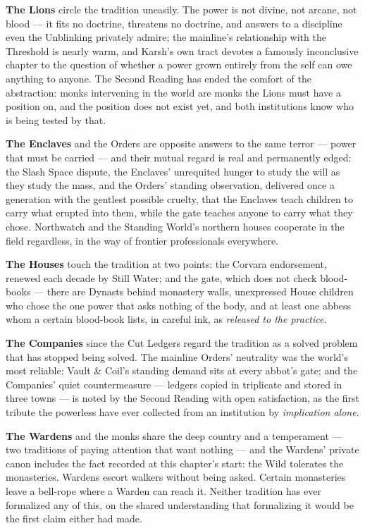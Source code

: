 \textbf{The Lions} circle the tradition uneasily. The power is not divine, not arcane, not blood --- it fits no doctrine, threatens no doctrine, and answers to a discipline even the Unblinking privately admire; the mainline's relationship with the Threshold is nearly warm, and Karsh's own tract devotes a famously inconclusive chapter to the question of whether a power grown entirely from the self can owe anything to anyone. The Second Reading has ended the comfort of the abstraction: monks intervening in the world are monks the Lions must have a position on, and the position does not exist yet, and both institutions know who is being tested by that.

\textbf{The Enclaves} and the Orders are opposite answers to the same terror --- power that must be carried --- and their mutual regard is real and permanently edged: the Slash Space dispute, the Enclaves' unrequited hunger to study the will as they study the mass, and the Orders' standing observation, delivered once a generation with the gentlest possible cruelty, that the Enclaves teach children to carry what erupted into them, while the gate teaches anyone to carry what they chose. Northwatch and the Standing World's northern houses cooperate in the field regardless, in the way of frontier professionals everywhere.

\textbf{The Houses} touch the tradition at two points: the Corvara endorsement, renewed each decade by Still Water; and the gate, which does not check blood-books --- there are Dynasts behind monastery walls, unexpressed House children who chose the one power that asks nothing of the body, and at least one abbess whom a certain blood-book lists, in careful ink, as \textit{released to the practice}.

\textbf{The Companies} since the Cut Ledgers regard the tradition as a solved problem that has stopped being solved. The mainline Orders' neutrality was the world's most reliable; Vault \& Coil's standing demand sits at every abbot's gate; and the Companies' quiet countermeasure --- ledgers copied in triplicate and stored in three towns --- is noted by the Second Reading with open satisfaction, as the first tribute the powerless have ever collected from an institution by \textit{implication alone}.

\textbf{The Wardens} and the monks share the deep country and a temperament --- two traditions of paying attention that want nothing --- and the Wardens' private canon includes the fact recorded at this chapter's start: the Wild tolerates the monasteries. Wardens escort walkers without being asked. Certain monasteries leave a bell-rope where a Warden can reach it. Neither tradition has ever formalized any of this, on the shared understanding that formalizing it would be the first claim either had made.

